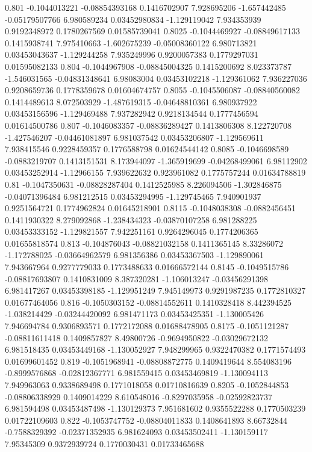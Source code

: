 {0.801 -0.1044013221 -0.08854393168 0.1416702907 7.928695206 -1.657442485 -0.05179507766 6.980589234 0.03452980834 -1.129119042 7.934353939 0.9192348972 0.1780267569 0.01585739041
0.8025 -0.1044469927 -0.08849617133 0.1415938741 7.975410663 -1.602675239 -0.05008360122 6.980713821 0.03453043637 -1.129244258 7.935249996 0.9200057383 0.1779297031 0.01595082133
0.804 -0.1044967908 -0.08845004325 0.1415200692 8.023373787 -1.546031565 -0.04831348641 6.98083004 0.03453102218 -1.129361062 7.936227036 0.9208659736 0.1778359678 0.01604674757
0.8055 -0.1045506087 -0.08840560082 0.1414489613 8.072503929 -1.487619315 -0.04648810361 6.980937922 0.03453156596 -1.129469488 7.937282942 0.9218134544 0.1777456594 0.01614500786
0.807 -0.1046083357 -0.08836289427 0.1413806308 8.122720708 -1.427546207 -0.04461081897 6.981037542 0.03453206807 -1.129569611 7.938415546 0.9228459357 0.1776588798 0.01624544142
0.8085 -0.1046698589 -0.0883219707 0.1413151531 8.173944097 -1.365919699 -0.04268499061 6.98112902 0.03453252914 -1.12966155 7.939622632 0.923961082 0.1775757244 0.01634788819
0.81 -0.1047350631 -0.08828287404 0.1412525985 8.226094506 -1.302846875 -0.04071396484 6.981212515 0.03453294995 -1.129745465 7.940901937 0.9251564721 0.1774962824 0.01645218901
0.8115 -0.1048038308 -0.0882456451 0.1411930322 8.279092868 -1.238434323 -0.03870107258 6.981288225 0.03453333152 -1.129821557 7.942251161 0.9264296045 0.1774206365 0.01655818574
0.813 -0.104876043 -0.08821032158 0.1411365145 8.33286072 -1.172788025 -0.03664962579 6.981356386 0.03453367503 -1.129890061 7.943667964 0.9277779033 0.1773488633 0.01666572144
0.8145 -0.1049515786 -0.08817693807 0.1410831009 8.387320281 -1.106013247 -0.03456291398 6.981417267 0.03453398185 -1.129951249 7.945149973 0.9291987235 0.1772810327 0.01677464056
0.816 -0.1050303152 -0.08814552611 0.1410328418 8.442394525 -1.038214429 -0.03244420092 6.981471173 0.03453425351 -1.130005426 7.946694784 0.9306893571 0.1772172088 0.01688478905
0.8175 -0.1051121287 -0.08811611418 0.1409857827 8.49800726 -0.9694950822 -0.03029672132 6.981518435 0.03453449168 -1.130052927 7.948299965 0.9322470382 0.1771574493 0.01699601452
0.819 -0.1051968941 -0.08808872775 0.1409419644 8.554083196 -0.8999576868 -0.02812367771 6.981559415 0.03453469819 -1.130094113 7.949963063 0.9338689498 0.1771018058 0.01710816639
0.8205 -0.1052844853 -0.08806338929 0.1409014229 8.610548016 -0.8297035958 -0.02592823737 6.981594498 0.03453487498 -1.130129373 7.951681602 0.9355522288 0.1770503239 0.01722109603
0.822 -0.1053747752 -0.08804011833 0.1408641893 8.66732844 -0.7588329392 -0.02371352935 6.981624093 0.03453502411 -1.130159117 7.95345309 0.9372939724 0.1770030431 0.01733465688
}
